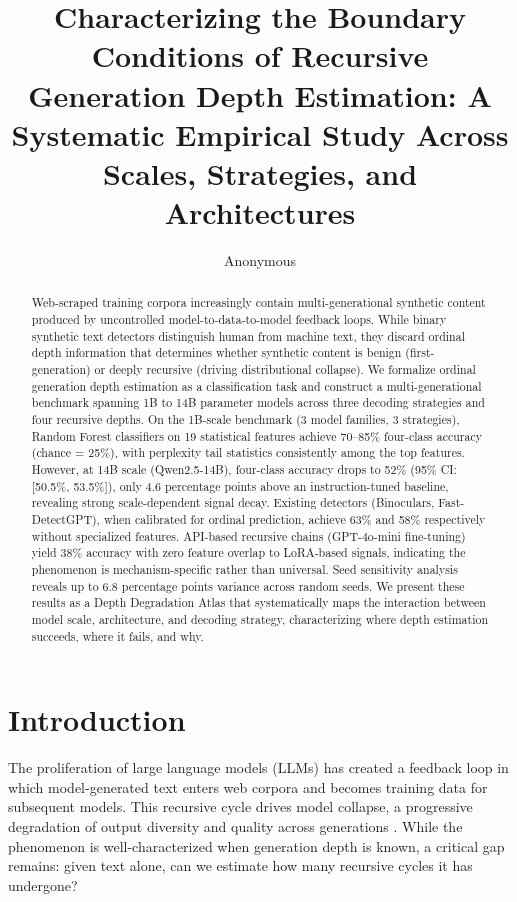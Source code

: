 \documentclass[11pt,a4paper]{article}
\title{Characterizing the Boundary Conditions of Recursive Generation Depth Estimation: A Systematic Empirical Study Across Scales, Strategies, and Architectures}
\author{Anonymous}
\date{}
\begin{document}
\maketitle

\begin{abstract}
Web-scraped training corpora increasingly contain multi-generational synthetic content produced by uncontrolled model-to-data-to-model feedback loops. While binary synthetic text detectors distinguish human from machine text, they discard ordinal depth information that determines whether synthetic content is benign (first-generation) or deeply recursive (driving distributional collapse). We formalize ordinal generation depth estimation as a classification task and construct a multi-generational benchmark spanning 1B to 14B parameter models across three decoding strategies and four recursive depths. On the 1B-scale benchmark (3 model families, 3 strategies), Random Forest classifiers on 19 statistical features achieve 70--85\% four-class accuracy (chance = 25\%), with perplexity tail statistics consistently among the top features. However, at 14B scale (Qwen2.5-14B), four-class accuracy drops to 52\% (95\% CI: [50.5\%, 53.5\%]), only 4.6 percentage points above an instruction-tuned baseline, revealing strong scale-dependent signal decay. Existing detectors (Binoculars, Fast-DetectGPT), when calibrated for ordinal prediction, achieve 63\% and 58\% respectively without specialized features. API-based recursive chains (GPT-4o-mini fine-tuning) yield 38\% accuracy with zero feature overlap to LoRA-based signals, indicating the phenomenon is mechanism-specific rather than universal. Seed sensitivity analysis reveals up to 6.8 percentage points variance across random seeds. We present these results as a Depth Degradation Atlas that systematically maps the interaction between model scale, architecture, and decoding strategy, characterizing where depth estimation succeeds, where it fails, and why.
\end{abstract}

\section{Introduction}

The proliferation of large language models (LLMs) has created a feedback loop in which model-generated text enters web corpora and becomes training data for subsequent models. This recursive cycle drives model collapse, a progressive degradation of output diversity and quality across generations \citep{shumailov2024model, dohmatob2024tale, gerstgrasser2024model}. While the phenomenon is well-characterized when generation depth is known, a critical gap remains: given text alone, can we estimate how many recursive cycles it has undergone?
\end{document}
